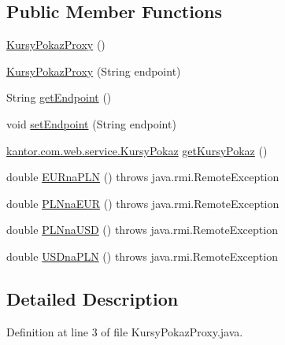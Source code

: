 \subsection*{Public Member Functions}
\begin{DoxyCompactItemize}
\item 
\hyperlink{classkantor_1_1com_1_1web_1_1service_1_1_kursy_pokaz_proxy_ae6cdeaadabceecc54919a6f1bd95324c}{Kursy\+Pokaz\+Proxy} ()
\item 
\hyperlink{classkantor_1_1com_1_1web_1_1service_1_1_kursy_pokaz_proxy_ac9c9cc06f2cb753581fc755c190c87d2}{Kursy\+Pokaz\+Proxy} (String endpoint)
\item 
String \hyperlink{classkantor_1_1com_1_1web_1_1service_1_1_kursy_pokaz_proxy_a42ed01fce4a879671d1eaf934aa5f04f}{get\+Endpoint} ()
\item 
void \hyperlink{classkantor_1_1com_1_1web_1_1service_1_1_kursy_pokaz_proxy_a80ada94218bc9a193387e22b5a6dce0a}{set\+Endpoint} (String endpoint)
\item 
\hyperlink{classkantor_1_1com_1_1web_1_1service_1_1_kursy_pokaz}{kantor.\+com.\+web.\+service.\+Kursy\+Pokaz} \hyperlink{classkantor_1_1com_1_1web_1_1service_1_1_kursy_pokaz_proxy_a6d65d3963ffa4efb031cca95e183a296}{get\+Kursy\+Pokaz} ()
\item 
double \hyperlink{classkantor_1_1com_1_1web_1_1service_1_1_kursy_pokaz_proxy_aa16bd4e29f240c450407162dea41a319}{E\+U\+Rna\+P\+L\+N} ()  throws java.\+rmi.\+Remote\+Exception
\item 
double \hyperlink{classkantor_1_1com_1_1web_1_1service_1_1_kursy_pokaz_proxy_ac1c39363de8b4da0827bf5f9f2014bed}{P\+L\+Nna\+E\+U\+R} ()  throws java.\+rmi.\+Remote\+Exception
\item 
double \hyperlink{classkantor_1_1com_1_1web_1_1service_1_1_kursy_pokaz_proxy_a52629df59f3ebd199c6080496a755fda}{P\+L\+Nna\+U\+S\+D} ()  throws java.\+rmi.\+Remote\+Exception
\item 
double \hyperlink{classkantor_1_1com_1_1web_1_1service_1_1_kursy_pokaz_proxy_a6a121fca243445158448a43bbd350403}{U\+S\+Dna\+P\+L\+N} ()  throws java.\+rmi.\+Remote\+Exception
\end{DoxyCompactItemize}


\subsection{Detailed Description}


Definition at line 3 of file Kursy\+Pokaz\+Proxy.\+java.



